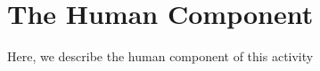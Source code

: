 \section{The Human Component}\label{sec:human}

Here, we describe the human component of this activity

\newpage
